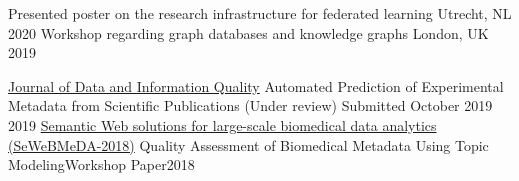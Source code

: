 \begin{cvhonors}
{Presented poster on the research infrastructure for federated learning}
{Utrecht, NL}
{2020}
{Workshop regarding graph databases and knowledge graphs}
{London, UK}
{2019}
\end{cvhonors}

\begin{cvhonors}
  \cvhonor
    {\href{https://dl.acm.org/journal/jdiq/}{Journal of Data and Information Quality}}
    {Automated Prediction of Experimental Metadata from Scientific Publications (Under review)}
    {Submitted October 2019 }
    {2019}
    \cvhonor
    {\href{https://sites.google.com/insight-centre.org/sewebmeda-2018/home?authuser=0}{Semantic Web solutions for large-scale biomedical data analytics (SeWeBMeDA-2018)}}
    {Quality Assessment of Biomedical Metadata Using Topic Modeling}{Workshop Paper}{2018}
\end{cvhonors}
